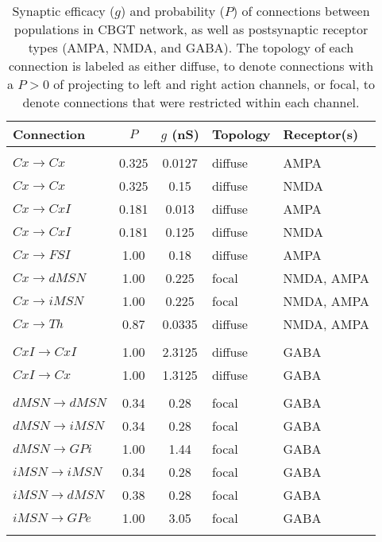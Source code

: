 \begin{table}[h!] \label{tab.ConnProb}
\centering
\caption{Synaptic efficacy ($g$) and probability ($P$) of connections between populations in CBGT network, as well as postsynaptic receptor types (AMPA, NMDA, and GABA). The topology of each connection is labeled as either diffuse, to denote connections with a $P>0$ of projecting to left and right action channels, or focal, to denote connections that were restricted within each channel.}
\label{table:connTable}
\begin{tabular}{l | ccll}
{\bf Connection} & {$P$} & {$g$ (nS)} & {\bf Topology} & {\bf Receptor(s)} \\ [1ex] \hline \\ [-1.5ex]

$Cx \rightarrow Cx$     &     0.325 &   0.0127  & diffuse  & AMPA       \\
$Cx \rightarrow Cx$     &     0.325 &   0.15    & diffuse  & NMDA       \\
$Cx \rightarrow CxI$    &     0.181 &   0.013   & diffuse  & AMPA       \\
$Cx \rightarrow CxI$    &     0.181 &   0.125   & diffuse  & NMDA       \\
$Cx \rightarrow FSI$    &     1.00  &   0.18    & diffuse  & AMPA       \\
$Cx \rightarrow dMSN$   &     1.00  &   0.225   & focal    & NMDA, AMPA \\
$Cx \rightarrow iMSN$   &     1.00  &   0.225   & focal    & NMDA, AMPA \\
$Cx \rightarrow Th$     &     0.87  &   0.0335  & diffuse  & NMDA, AMPA \\ [1ex] \hline \\ [-1.5ex]

$CxI \rightarrow CxI$   &     1.00  &   2.3125  & diffuse  & GABA       \\
$CxI \rightarrow Cx$    &     1.00  &   1.3125  & diffuse  & GABA       \\ [1ex] \hline \\ [-1.5ex]

$dMSN \rightarrow dMSN$ &     0.34  &   0.28    & focal    & GABA       \\
$dMSN \rightarrow iMSN$ &     0.34  &   0.28    & focal    & GABA       \\
$dMSN \rightarrow GPi$  &     1.00  &   1.44    & focal    & GABA       \\
$iMSN \rightarrow iMSN$ &     0.34  &   0.28    & focal    & GABA       \\
$iMSN \rightarrow dMSN$ &     0.38  &   0.28    & focal    & GABA       \\
$iMSN \rightarrow GPe$  &     1.00  &   3.05    & focal    & GABA       \\ [1ex] \hline \\ [-1.5ex]


\end{tabular}
\end{table}
